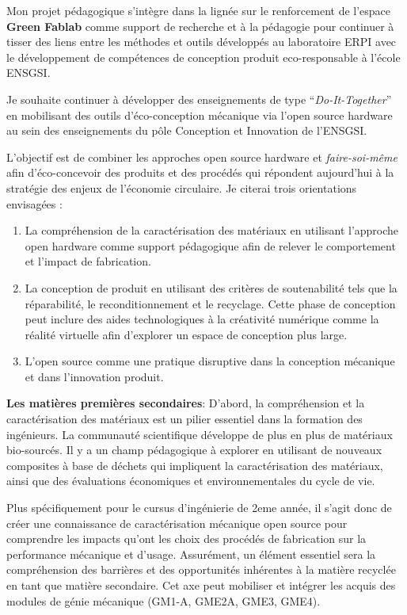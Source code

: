 \documentclass[
  11pt,
]{article}
\begin{document}
Mon projet pédagogique s'intègre dans la lignée sur le renforcement de
l'espace \textbf{Green Fablab }comme support de recherche et à la
pédagogie pour continuer à tisser des liens entre les méthodes et outils
développés au laboratoire ERPI avec le développement de compétences de
conception produit eco-responsable à l'école ENSGSI.

Je souhaite continuer à développer des enseignements de type
``\emph{Do-It-Together}'' en mobilisant des outils d'éco-conception
mécanique via l'open source hardware au sein des enseignements du pôle
Conception et Innovation de l'ENSGSI.

L'objectif est de combiner les approches open source hardware et
\emph{faire-soi-même} afin d'éco-concevoir des produits et des procédés
qui répondent aujourd'hui à la stratégie des enjeux de l'économie
circulaire. Je citerai trois orientations envisagées :

\begin{enumerate}
\def\labelenumi{\arabic{enumi}.}
\item
  La compréhension de la caractérisation des matériaux en utilisant
  l'approche open hardware comme support pédagogique afin de relever le
  comportement et l'impact de fabrication.
\item
  La conception de produit en utilisant des critères de soutenabilité
  tels que la réparabilité, le reconditionnement et le recyclage. Cette
  phase de conception peut inclure des aides technologiques à la
  créativité numérique comme la réalité virtuelle afin d'explorer un
  espace de conception plus large.
\item
  L'open source comme une pratique disruptive dans la conception
  mécanique et dans l'innovation produit.
\end{enumerate}

\textbf{Les matières premières secondaires}: D'abord, la compréhension
et la caractérisation des matériaux est un pilier essentiel dans la
formation des ingénieurs. La communauté scientifique développe de plus
en plus de matériaux bio-sourcés. Il y a un champ pédagogique à explorer
en utilisant de nouveaux composites à base de déchets qui impliquent la
caractérisation des matériaux, ainsi que des évaluations économiques et
environnementales du cycle de vie.

Plus spécifiquement pour le cursus d'ingénierie de 2eme année, il s'agit
donc de créer une connaissance de caractérisation mécanique open source
pour comprendre les impacts qu'ont les choix des procédés de fabrication
sur la performance mécanique et d'usage. Assurément, un élément
essentiel sera la compréhension des barrières et des opportunités
inhérentes à la matière recyclée en tant que matière secondaire. Cet axe
peut mobiliser et intégrer les acquis des modules de génie mécanique
(GM1-A, GME2A, GME3, GME4).
\end{document}
